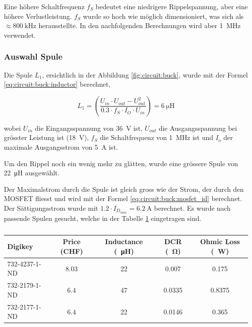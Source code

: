 Eine h\"ohere Schaltfrequenz $f_S$ bedeutet eine niedrigere Rippelspannung, aber
eine h\"ohere Verlustleistung. $f_S$ wurde so hoch wie m\"oglich  dimensioniert,
was sich als $\approx \SI{800}{\kilo\hertz}$ herausstellte. In den nachfolgenden
Berechnungen wird aber \SI{1}{\mega\hertz} verwendet.

\subsubsection*{Auswahl Spule}

Die Spule $L_1$, ersichtlich in der Abbildung \ref{fig:circuit:buck}, wurde  mit
der Formel \ref{eq:circuit:buck:inductor} berechnet,

\begin{equation}
    L_1 = \left( \frac{U_{in} \cdot U_{out} - U_{out}^2}{0.3 \cdot f_S \cdot I_O \cdot U_{in}} \right) = \SI{6}{\micro\henry}
    \label{eq:circuit:buck:inductor}
\end{equation}

wobei  $U_{in}$  die  Eingangsspannung von  \SI{36}{\volt}  ist,  $U_{out}$  die
Ausgangsspannung  bei  gr\"osster   Leistung  ist  (\SI{18}{\volt}),  $f_S$  die
Schaltfrequenz von  \SI{1}{\mega\hertz} ist und $I_o$ der maximale Ausgangsstrom
von \SI{5}{\ampere} ist.

Um den Rippel  noch ein wenig mehr zu gl\"atten, wurde eine gr\"ossere Spule von
\SI{22}{\micro\henry} ausgew\"ahlt.

Der Maximalstrom durch die Spule ist gleich gross wie  der  Strom, der durch den
MOSFET   fliesst   und   wird  mit  der  Formel  \ref{eq:circuit:buck:mosfet_id}
berechnet.  Der  S\"attigungsstrom   wurde   mit   $1.2   \cdot   I_{D_{max}}  =
\SI{6.2}{\ampere}$ berechnet. Es  wurde  nach passende Spulen gesucht, welche in
der Tabelle \ref{tab:circuit:buck:inductor} eingetragen sind.

\begin{table}[th!]
    \begin{center}
        \caption{}
        \label{tab:circuit:buck:inductor}
        \begin{tabular}{lcccc}
            \toprule
            Digikey         & Price (CHF) & Inductance (\SI{}{\micro\henry}) & DCR (\SI{}{\ohm}) & Ohmic Loss (\SI{}{\watt}) \\
            \midrule
            \rowcolor{lightgray}
            732-4237-1-ND   & 8.03        & 22                               & 0.007             & 0.175  \\
            732-2179-1-ND   & 6.4         & 47                               & 0.0335            & 0.8375 \\
            732-2177-1-ND   & 6.4         & 22                               & 0.0146            & 0.365  \\
            \bottomrule
        \end{tabular}
    \end{center}
\end{table}

